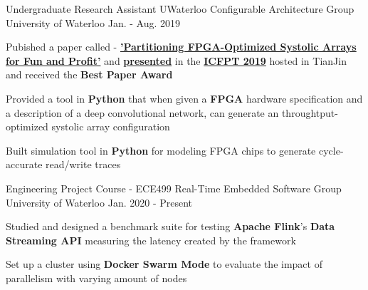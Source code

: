 


\begin{cventries}


\cventry
{Undergraduate Research Assistant} %
{UWaterloo Configurable Architecture Group} %
{University of Waterloo} %
{Jan. - Aug. 2019} %
{ %
\begin{cvitems}
\item {
    Pubished a paper called - 
    \textbf{
        \href{https://git.uwaterloo.ca/watcag-public/fpga-syspart}
        {'Partitioning FPGA-Optimized Systolic Arrays for Fun and Profit'}}
    and 
    \textbf{
        \href{https://www.youtube.com/watch?v=nVLZWJdZ-64}
        {presented}}
    in the 
    \textbf{
        \href{http://fpt19.tju.edu.cn/Registration.htm}
        {ICFPT 2019}}
    hosted in TianJin and received the \textbf{Best Paper Award}
}
\item {
    Provided a tool in \textbf{Python} that when given 
    a \textbf{FPGA} hardware specification and 
    a description of a deep convolutional network, 
    can generate an throughtput-optimized systolic array configuration
}
\item {
    Built simulation tool in \textbf{Python} for modeling 
    FPGA chips to generate cycle-accurate read/write traces
}
\end{cvitems}
}


\cventry
{Engineering Project Course - ECE499} %
{Real-Time Embedded Software Group} %
{University of Waterloo} %
{Jan. 2020 - Present} %
{ %
\begin{cvitems}
\item {
    Studied and designed a benchmark suite for testing 
    \textbf{Apache Flink}'s \textbf{Data Streaming API}
    measuring the latency created by the framework
}
\item {
    Set up a cluster using \textbf{Docker Swarm Mode} to evaluate
    the impact of parallelism with varying amount of nodes
}
\end{cvitems}
}

\end{cventries}